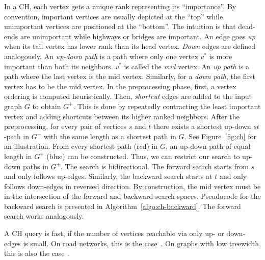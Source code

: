 \documentclass[manuscript,review]{acmart}
\newcommand*{\gchu}{G^{\uparrow}}
\newcommand*{\gchd}{G^{\downarrow}}
\begin{document}
In a CH, each vertex gets a unique rank representing its ``importance''.
By convention, important vertices are usually depicted at the ``top'' while unimportant vertices are positioned at the ``bottom''.
The intuition is that dead-ends are unimportant while highways or bridges are important.
An edge goes \emph{up} when its tail vertex has lower rank than its head vertex.
\emph{Down} edges are defined analogously.
An \emph{up-down path} is a path where only one vertex $v^*$ is more important than both its neighbors.
$v^*$ is called the \emph{mid} vertex.
An \emph{up path} is a path where the last vertex is the mid vertex.
Similarly, for a \emph{down path}, the first vertex has to be the mid vertex.
%
In the preprocessing phase, first, a vertex ordering is computed heuristically.
Then, \emph{shortcut} edges are added to the input graph $G$ to obtain $G^+$.
This is done by repeatedly contracting the least important vertex and adding shortcuts between its higher ranked neighbors.
After the preprocessing, for every pair of vertices $s$ and $t$ there exists a shortest up-down $st$-path in $G^+$ with the same length as a shortest path in $G$.
See Figure~\ref{fig:ch} for an illustration.
From every shortest path (red) in $G$, an up-down path of equal length in $G^+$ (blue) can be constructed.
Thus, we can restrict our search to up-down paths in $G^+$.
The search is bidirectional.
The forward search starts from $s$ and only follows up-edges.
Similarly, the backward search starts at $t$ and only follows down-edges in reversed direction.
By construction, the mid vertex must be in the intersection of the forward and backward search spaces.
Pseudocode for the backward search is presented in Algorithm~\ref{algo:ch-backward}.
The forward search works analogously.

A CH query is fast, if the number of vertices reachable via only up- or down-edges is small.
On road networks, this is the case~\cite{gssv-erlrn-12,dgpw-crprn-13}.
On graphs with low treewidth, this is also the case~\cite{dsw-cch-15,hs-gbpo-18}.

\end{document}
